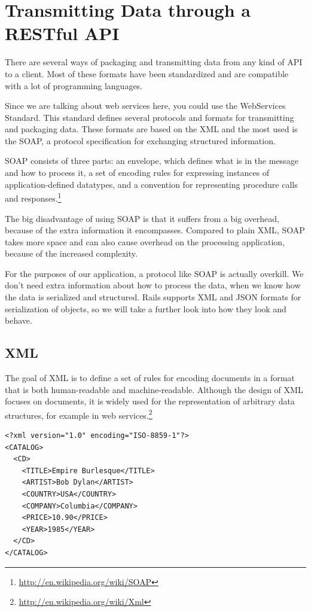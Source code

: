 \section{Transmitting Data through a RESTful API}
There are several ways of packaging and transmitting data from any kind of \ac{API} to a client. Most of these formats have been standardized and are compatible with a lot of programming languages.

Since we are talking about web services here, you could use the WebServices Standard. This standard defines several protocols and formats for transmitting and packaging data. These formats are based on the \ac{XML} and the most used is the \ac{SOAP}, a protocol specification for exchanging structured information. 

\ac{SOAP} consists of three parts: an envelope, which defines what is in the message and how to process it, a set of encoding rules for expressing instances of application-defined datatypes, and a convention for representing procedure calls and responses.\footnote{\url{http://en.wikipedia.org/wiki/SOAP}}

The big disadvantage of using \ac{SOAP} is that it suffers from a big overhead, because of the extra information it encompasses. Compared to plain \ac{XML}, \ac{SOAP} takes more space and can also cause overhead on the processing application, because of the increased complexity.

For the purposes of our application, a protocol like \ac{SOAP} is actually overkill. We don't need extra information about how to process the data, when we know how the data is serialized and structured. Rails supports \ac{XML} and \ac{JSON} formats for serialization of objects, so we will take a further look into how they look and behave.
\newpage
\subsection{XML}
The goal of \ac{XML} is to define a set of rules for encoding documents in a format that is both human-readable and machine-readable. Although the design of XML focuses on documents, it is widely used for the representation of arbitrary data structures, for example in web services.\footnote{\url{http://en.wikipedia.org/wiki/Xml}}

\lstset{language=XML}
\begin{lstlisting}[frame=lt,caption=An XML example]
<?xml version="1.0" encoding="ISO-8859-1"?>
<CATALOG>
  <CD>
    <TITLE>Empire Burlesque</TITLE>
    <ARTIST>Bob Dylan</ARTIST>
    <COUNTRY>USA</COUNTRY>
    <COMPANY>Columbia</COMPANY>
    <PRICE>10.90</PRICE>
    <YEAR>1985</YEAR>
  </CD>
</CATALOG>

\end{lstlisting}


